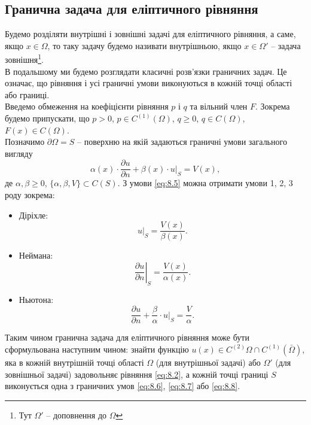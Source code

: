 \subsection{Гранична задача для еліптичного рівняння}

Будемо розділяти внутрішні і зовнішні задачі для еліптичного рівняння, а саме, якщо $x \in \Omega$, то таку задачу будемо називати внутрішньою, якщо $x \in \Omega'$ -- задача зовнішня\footnote{Тут $\Omega'$ -- доповнення до $\Omega$}. \\

В подальшому ми будемо розглядати класичні розв'язки граничних задач. Це означає, що рівняння і усі граничні умови виконуються в кожній точці області або границі. \\

Введемо обмеження на коефіцієнти рівняння $p$ і $q$ та вільний член $F$. Зокрема будемо припускати, що $p > 0$, $p \in C^{(1)}(\Omega)$, $q \ge 0$, $q \in C(\Omega)$, $F(x) \in C(\Omega)$. \\

Позначимо $\partial \Omega = S$ -- поверхню на якій задаються граничні умови загального вигляду
\begin{equation}
	\label{eq:8.5}
	\alpha(x) \cdot \frac{\partial u}{\partial n} + \beta(x) \cdot u|_S = V(x),
\end{equation}
де $\alpha, \beta \ge 0$, $\{\alpha, \beta, V\} \subset C(S)$. З умови \eqref{eq:8.5} можна отримати умови 1, 2, 3 роду зокрема:
\begin{itemize}
	\item Діріхле:
	\begin{equation}
		\label{eq:8.6}
		u|_S = \frac{V(x)}{\beta(x)}.
	\end{equation} 
	\item Неймана:
	\begin{equation}
		\label{eq:8.7}
		\left. \frac{\partial u}{\partial n} \right|_S = \frac{V(x)}{\alpha(x)}.
	\end{equation}
	\item Ньютона:
	\begin{equation}
		\label{eq:8.8}
		\frac{\partial u}{\partial n} + \frac{\beta}{\alpha} \cdot u|_S = \frac{V}{\alpha}.
	\end{equation}
\end{itemize}

Таким чином гранична задача для еліптичного рівняння може бути сформульована наступним чином: знайти функцію $u(x) \in C^{(2)}{\Omega} \cap C^{(1)}(\bar \Omega)$, яка в кожній внутрішній точці області $\Omega$ (для внутрішньої задачі) або $\Omega'$ (для зовнішньої задачі) задовольняє рівняння \eqref{eq:8.2}, а кожній точці границі $S$ виконується одна з граничних умов \eqref{eq:8.6}, \eqref{eq:8.7} або \eqref{eq:8.8}. \\

